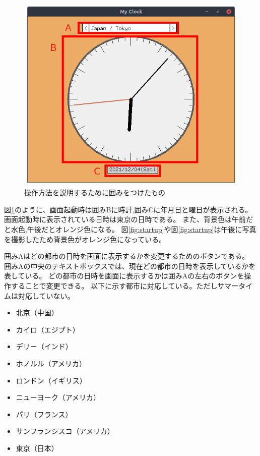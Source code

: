 \documentclass[a4paper,11pt]{jsarticle}
\begin{document}
    \begin{figure}[H]
      \centering
      \includegraphics[scale=0.3]{./readme_img/startup_control.png}
      \caption{操作方法を説明するために囲みをつけたもの}
      \label{fig:startup-control}
    \end{figure}

    図\ref{fig:startup-control}のように、画面起動時は囲みBに時計,囲みCに年月日と曜日が表示される。
    画面起動時に表示されている日時は東京の日時である。
    また、背景色は午前だと水色,午後だとオレンジ色になる。
    図\ref{fig:startup}や図\ref{fig:startup}は午後に写真を撮影したため背景色がオレンジ色になっている。

    囲みAはどの都市の日時を画面に表示するかを変更するためのボタンである。
    囲みAの中央のテキストボックスでは、現在どの都市の日時を表示しているかを表している。
    どの都市の日時を画面に表示するかは囲みAの左右のボタンを操作することで変更できる。
    以下に示す都市に対応している。ただしサマータイムは対応していない。

    \begin{itemize}
      \item 北京（中国）
      \item カイロ（エジプト）
      \item デリー（インド）
      \item ホノルル（アメリカ）
      \item ロンドン（イギリス）
      \item ニューヨーク（アメリカ）
      \item パリ（フランス）
      \item サンフランシスコ（アメリカ）
      \item 東京（日本）
    \end{itemize}
    
\end{document}
